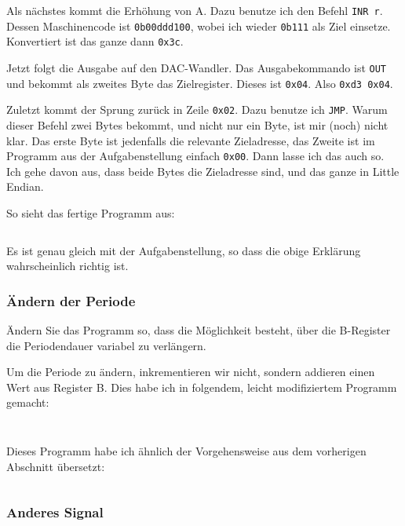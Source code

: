 Als nächstes kommt die Erhöhung von A. Dazu benutze ich den Befehl
\texttt{INR~r}. Dessen Maschinencode ist \texttt{0b00ddd100}, wobei ich wieder
\texttt{0b111} als Ziel einsetze. Konvertiert ist das ganze dann \texttt{0x3c}.

Jetzt folgt die Ausgabe auf den DAC-Wandler. Das Ausgabekommando ist
\texttt{OUT} und bekommt als zweites Byte das Zielregister. Dieses ist
\texttt{0x04}. Also \texttt{0xd3~0x04}.

Zuletzt kommt der Sprung zurück in Zeile \texttt{0x02}. Dazu benutze ich
\texttt{JMP}. Warum dieser Befehl zwei Bytes bekommt, und nicht nur ein Byte,
ist mir (noch) nicht klar. Das erste Byte ist jedenfalls die relevante
Zieladresse, das Zweite ist im Programm aus der Aufgabenstellung einfach
\texttt{0x00}. Dann lasse ich das auch so. Ich gehe davon aus, dass beide Bytes
die Zieladresse sind, und das ganze in Little Endian.

So sieht das fertige Programm aus:

\inputminted[fontsize=\small, linenos]{python}{../Assembly/a.s}

Es ist genau gleich mit der Aufgabenstellung, so dass die obige Erklärung
wahrscheinlich richtig ist.

\subsubsection{Ändern der Periode}

\begin{problem}
	Ändern Sie das Programm so, dass die Möglichkeit besteht, über die
	B-Register die Periodendauer variabel zu verlängern.
\end{problem}

Um die Periode zu ändern, inkrementieren wir nicht, sondern addieren einen Wert
aus Register B. Dies habe ich in folgendem, leicht modifiziertem Programm
gemacht:

\inputminted[fontsize=\small, linenos]{cpp}{../Prototypen/d.cpp}

\begin{multicols}{9}
	\inputminted[fontsize=\footnotesize]{text}{d.txt}
\end{multicols}

Dieses Programm habe ich ähnlich der Vorgehensweise aus dem vorherigen
Abschnitt übersetzt:

\inputminted[fontsize=\small, linenos]{python}{../Assembly/d.s}

\subsubsection{Anderes Signal}

